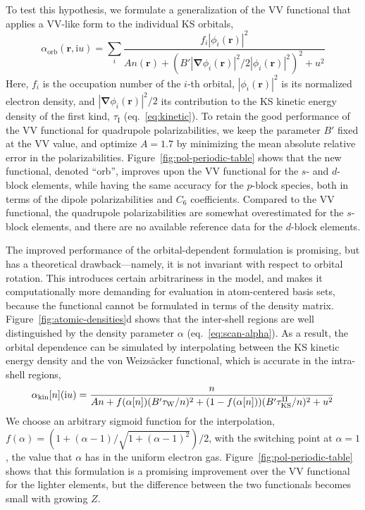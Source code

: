To test this hypothesis, we formulate a generalization of the VV functional that applies a VV-like form to the individual KS orbitals,
\begin{equation}
  \alpha_\text{orb}(\mathbf r,\mathrm iu)=\sum_i\frac{f_i|\phi_i(\mathbf r)|^2}{An(\mathbf r)+(B'|\boldsymbol\nabla\phi_i(\mathbf r)|^2/2|\phi_i(\mathbf r)|^2)^2+u^2}
\end{equation}
Here, $f_i$ is the occupation number of the $i$-th orbital, $|\phi_i(\mathbf r)|^2$ is its normalized electron density, and $|\boldsymbol\nabla\phi_i(\mathbf r)|^2/2$ its contribution to the KS kinetic energy density of the first kind, $\tau_\text{I}$ (eq.~\ref{eq:kinetic}).
To retain the good performance of the VV functional for quadrupole polarizabilities, we keep the parameter $B'$ fixed at the VV value, and optimize $A=1.7$ by minimizing the mean absolute relative error in the polarizabilities.
Figure~\ref{fig:pol-periodic-table} shows that the new functional, denoted ``orb'', improves upon the VV functional for the $s$- and $d$-block elements, while having the same accuracy for the $p$-block species, both in terms of the dipole polarizabilities and $C_6$ coefficients.
Compared to the VV functional, the quadrupole polarizabilities are somewhat overestimated for the $s$-block elements, and there are no available reference data for the $d$-block elements.

The improved performance of the orbital-dependent formulation is promising, but has a theoretical drawback---namely, it is not invariant with respect to orbital rotation.
This introduces certain arbitrariness in the model, and makes it computationally more demanding for evaluation in atom-centered basis sets, because the functional cannot be formulated in terms of the density matrix.
Figure~\ref{fig:atomic-densities}d shows that the inter-shell regions are well distinguished by the density parameter $\alpha$ (eq.~\eqref{eq:scan-alpha}).
As a result, the orbital dependence can be simulated by interpolating between the KS kinetic energy density and the von Weizsäcker functional, which is accurate in the intra-shell regions,
\begin{equation}
  \alpha_\text{kin}[n](\mathrm iu)=\frac{n}{An+f(\alpha[n])(B'\tau_\text W/n)^2+(1-f(\alpha[n]))(B'\tau_\text{KS}^\text{II}/n)^2+u^2}
\end{equation}
We choose an arbitrary sigmoid function for the interpolation, $f(\alpha)=(1+(\alpha-1)/\sqrt{1+(\alpha-1)^2})/2$, with the switching point at $\alpha=1$, the value that $\alpha$ has in the uniform electron gas.
Figure~\ref{fig:pol-periodic-table} shows that this formulation is a promising improvement over the VV functional for the lighter elements, but the difference between the two functionals becomes small with growing $Z$.

